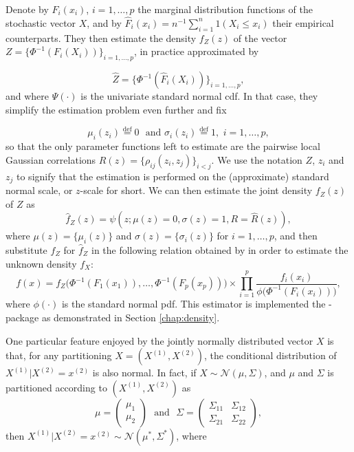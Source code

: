 Denote by $F_i(x_i)$, $i = 1,\ldots, p$ the marginal distribution functions of the stochastic vector $X$, and by $\widehat F_i(x_i) = n^{-1}\sum_{i=1}^n 1(X_i \leq x_i)$ their empirical counterparts. They then estimate the density $f_Z(z)$ of the vector $Z = \{\Phi^{-1}(F_i(X_i))\}_{i=1,\ldots,p}$, in practice approximated by 

\begin{equation}
\widehat Z = \{\Phi^{-1}(\widehat F_i(X_i))\}_{i=1,\ldots,p}, 
\label{eq:trans}
\end{equation}
and where $\Psi(\cdot)$ is the univariate standard normal cdf. In that case, they simplify the estimation problem even further and fix

\begin{equation}
\mu_i(z_i) \stackrel{\textrm{def}}{=} 0 \,\, \textrm{ and } \sigma_i(z_i) \stackrel{\textrm{def}}{=} 1, \,\, i = 1,\ldots,p,
\label{eq:simp}
\end{equation}
so that the only parameter functions left to estimate are the pairwise local Gaussian correlations $R(z) = \{\rho_{ij}(z_i, z_j)\}_{i<j}$. We use the notation $Z$, $z_i$ and $z_j$ to signify that the estimation is performed on the (approximate) standard normal scale, or $z$-scale for short. We can then estimate the joint density $f_Z(z)$ of $Z$ as
\begin{equation}
\widehat f_Z(z) = \psi(z; \mu(z) = 0, \sigma(z) = 1, R = \widehat R(z)),
\label{eq:transformed-density}
\end{equation}
where $\mu(z) = \{\mu_i(z)\}$ and $\sigma(z) = \{\sigma_i(z)\}$ for $i=1,\ldots,p$, and then substitute $f_Z$ for $\widehat f_Z$ in the following relation obtained by \citet{otne:tjos:2017} in order to estimate the unknown density $f_X$:
\begin{equation}
f(x) = f_{Z}\big(\Phi^{-1}(F_1(x_1)), \ldots, \Phi^{-1}(F_p(x_p))\big) \times \prod_{i=1}^p \frac{f_i(x_i)}{\phi\big(\Phi^{-1}(F_i(x_i))\big)},
\label{eq:backtrans}
\end{equation}
where $\phi(\cdot)$ is the standard normal pdf. This estimator is implemented the -package as demonstrated in Section \ref{chap:density}.

One particular feature enjoyed by the jointly normally distributed vector $X$ is that, for any partitioning $X = \left(X^{(1)}, X^{(2)}\right)$, the conditional distribution of $X^{(1)}|X^{(2)} = x^{(2)}$ is also normal. In fact, if $X \sim \mathcal{N}(\mu,\Sigma)$, and $\mu$ and $\Sigma$ is partitioned according to $\left(X^{(1)}, X^{(2)}\right)$ as
$$\mu = \begin{pmatrix} \mu_1 \\\mu_2 \end{pmatrix} \,\, \textrm{ and } \,\, \Sigma = \begin{pmatrix} \Sigma_{11} & \Sigma_{12} \\ \Sigma_{21} & \Sigma_{22} \end{pmatrix},$$
then $X^{(1)}|X^{(2)} = x^{(2)} \sim \mathcal{N}(\mu^*, \Sigma^*)$, where

